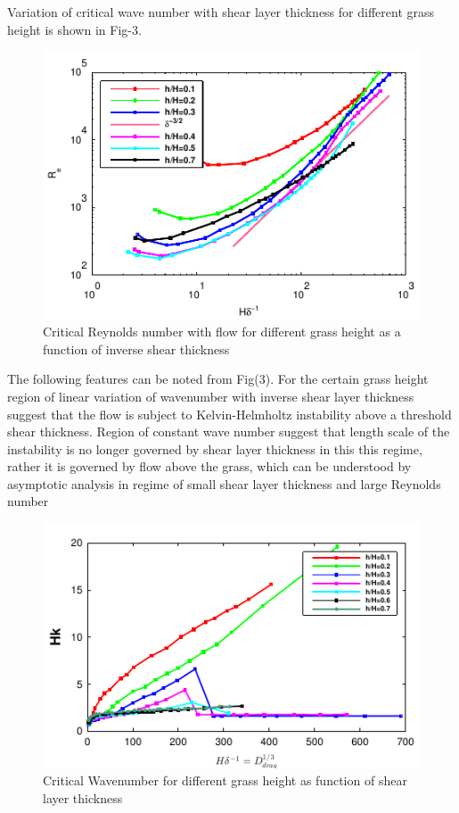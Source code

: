 \documentclass[aps,twocolumn,floatfix,prl,10pt]{revtex4-1}
\begin{document}
Variation of critical wave number with shear layer thickness for different grass height is shown in Fig-3.
\begin{figure}[htb!]
\includegraphics[]{Critical_Re_vs_delta}
\caption{Critical Reynolds number with flow for different grass height as a function of inverse shear thickness}
\end{figure}
\newline
The following features can be noted from Fig(3). For the certain grass height region of linear variation of wavenumber with inverse shear layer thickness suggest that the flow is subject 
to Kelvin-Helmholtz instability above a threshold shear thickness. Region of constant wave number suggest that length scale of the instability is no longer governed by shear layer
thickness in this this regime, rather it is governed by flow above the grass, which can be understood by asymptotic analysis in regime of small shear layer thickness and large Reynolds 
number
\begin{figure}[htb!]
\includegraphics[]{K_vs_shear_width}
\caption{Critical Wavenumber for different grass height as function of shear layer thickness}
\end{figure}
\end{document}
